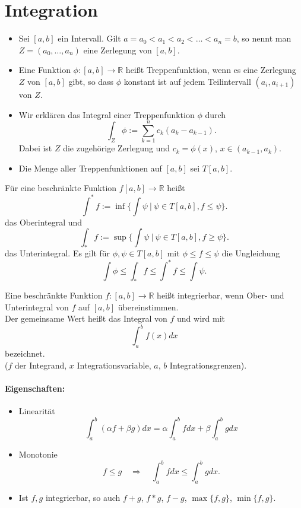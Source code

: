 \documentclass[a4paper,12pt,DIV15]{scrartcl}
\begin{document}
\section{Integration}
\begin{itemize}
\item  Sei $[a,b]$ ein Intervall. Gilt $a=a_0 < a_1 <a_2 < \dots <
                                 a_n=b$, so nennt man $Z=(a_0, \dots
                                 ,a_n)$ eine {\color{red} Zerlegung} von
                                 $[a,b]$.
\item Eine Funktion $\phi:[a,b] \rightarrow \mathbb{R}$ heißt {\color{red}
                                 Treppenfunktion}, wenn es eine
                                 Zerlegung $Z$ von $[a,b]$ gibt, so dass
                                 $\phi$ konstant ist auf jedem
                                 Teilintervall $(a_i,a_{i+1})$ von $Z$.
\item Wir erklären das Integral einer Treppenfunktion $\phi$ durch
\[\int_Z \phi := \sum_{k=1}^n c_k (a_k -a_{k-1}).\]
Dabei ist $Z$ die zugehörige Zerlegung und $c_k=\phi(x)$, $x\in
(a_{k-1},a_k)$.  
\item Die Menge aller Treppenfunktionen auf $[a,b]$ sei $T[a,b]$.
\end{itemize}


\begin{defn}
Für eine beschränkte Funktion $f[a,b]\rightarrow \mathbb{R}$
heißt
\[ \int^*f:= \inf  \{ \int \psi \ | \ \psi \in T[a,b], f \leq \psi \}. \]
das {\color{red} Oberintegral} und 
\[ \int_*f:= \sup  \{ \int \psi \ | \ \psi \in T[a,b], f \geq \psi \}.\]
das {\color{red} Unterintegral}. Es gilt für $\phi, \psi \in T[a,b]$ mit
$\phi \leq f \leq \psi$ die Ungleichung
\[ \int \phi \leq \int_* f \leq \int^* f \leq \int \psi.\]
\end{defn}

\begin{defn}
Eine beschränkte Funktion $f:[a,b] \rightarrow \mathbb{R}$ heißt {\color{red}
integrierbar}, wenn Ober- und Unterintegral von $f$ auf $[a,b]$ übereinstimmen.\\
Der gemeinsame Wert heißt das {\color{red} Integral} von $f$ und wird mit 
\[ \int_a^b f(x)dx \]
bezeichnet.\\ 
($f$ der Integrand, $x$ Integrationsvariable, $a$, $b$ Integrationsgrenzen).
\end{defn}

\paragraph{Eigenschaften:}
\begin{itemize}
\item Linearität
\[ \int_a^b (\alpha f + \beta g) dx = \alpha \int_a^b fdx + \beta
\int_a^b g dx \]
\item Monotonie
\[  f \leq g \quad \Rightarrow \quad \int_a^b f dx \leq \int_a^b g
dx.\]
\item Ist $f,g$ integrierbar, so auch $f+g$, $f*g$, $f-g$,
$\max\{f,g\}$, $\min \{f,g \}$. 
\end{itemize}
\end{document}
